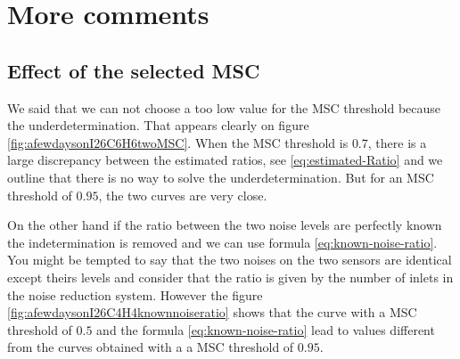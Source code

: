  

 \newpage

 \newpage

 \newpage



\newpage\clearpage
\section{More comments}
\subsection{Effect of the selected MSC}
We said that we can not choose a too low value for the MSC threshold because the underdetermination. That appears clearly on figure \ref{fig:afewdaysonI26C6H6twoMSC}.
When the  MSC threshold is $0.7$, there is a large discrepancy between the estimated ratios, see \eqref{eq:estimated-Ratio} and we outline that there is no way to solve the underdetermination. But for an MSC threshold of $0.95$, the two curves are very close.


On the other hand if the ratio between the two noise levels are perfectly known the indetermination is removed and we can use formula \eqref{eq:known-noise-ratio}. You might be tempted to say that the two noises on the two sensors are identical except theirs levels and consider that the ratio is given by the number of inlets in the noise reduction system. However the figure \ref{fig:afewdaysonI26C4H4knownnoiseratio} shows that the curve with a MSC threshold of $0.5$ and the formula \eqref{eq:known-noise-ratio} lead to values different from the curves obtained with a a MSC threshold of $0.95$.



